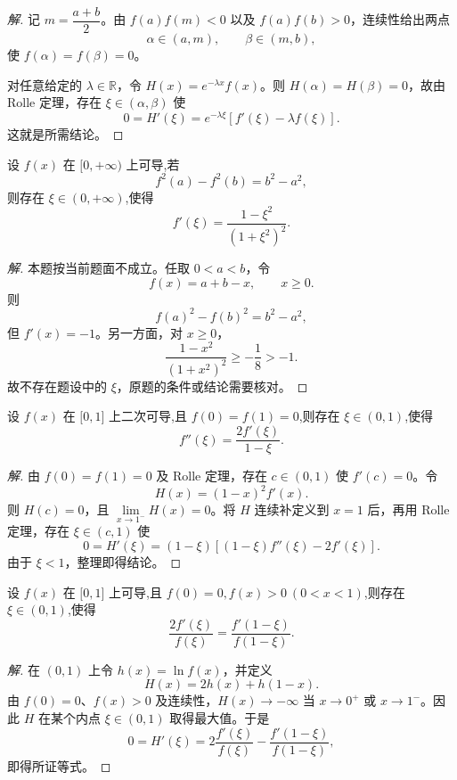 \documentclass[../../数学分析培优讲义(答案版).tex]{subfiles}
\begin{document}
\begin{proof}[解]
记 $m=\dfrac{a+b}{2}$。由 $f(a)f(m)<0$ 以及 $f(a)f(b)>0$，连续性给出两点
\[
    \alpha\in(a,m),
    \qquad
    \beta\in(m,b),
\]
使 $f(\alpha)=f(\beta)=0$。

对任意给定的 $\lambda\in\mathbb{R}$，令 $H(x)=e^{-\lambda x}f(x)$。则 $H(\alpha)=H(\beta)=0$，故由 Rolle 定理，存在 $\xi\in(\alpha,\beta)$ 使
\[
    0=H'(\xi)=e^{-\lambda\xi}[f'(\xi)-\lambda f(\xi)].
\]
这就是所需结论。
\end{proof}

\begin{example}
设 $f(x)$ 在 $\lbrack 0,+\infty)$ 上可导,若
\[
    f^2(a)-f^2(b)=b^2-a^2,
\]
则存在 $\xi\in(0,+\infty)$,使得
\[
    f'(\xi)=\dfrac{1-\xi^2}{(1+\xi^2)^2}.
\]
\end{example}

\begin{proof}[解]
本题按当前题面不成立。任取 $0<a<b$，令
\[
    f(x)=a+b-x,
    \qquad x\geq0.
\]
则
\[
    f(a)^2-f(b)^2=b^2-a^2,
\]
但 $f'(x)=-1$。另一方面，对 $x\geq0$，
\[
    \dfrac{1-x^2}{(1+x^2)^2}\geq-\dfrac{1}{8}>-1.
\]
故不存在题设中的 $\xi$，原题的条件或结论需要核对。
\end{proof}

\begin{example}
设 $f(x)$ 在 $\lbrack 0,1\rbrack$ 上二次可导,且 $f(0)=f(1)=0$,则存在 $\xi\in(0,1)$,使得
\[
    f''(\xi)=\dfrac{2f'(\xi)}{1-\xi}.
\]
\end{example}

\begin{proof}[解]
由 $f(0)=f(1)=0$ 及 Rolle 定理，存在 $c\in(0,1)$ 使 $f'(c)=0$。令
\[
    H(x)=(1-x)^2f'(x).
\]
则 $H(c)=0$，且 $\lim\limits_{x\to1^-}H(x)=0$。将 $H$ 连续补定义到 $x=1$ 后，再用 Rolle 定理，存在 $\xi\in(c,1)$ 使
\[
    0=H'(\xi)
    =(1-\xi)[(1-\xi)f''(\xi)-2f'(\xi)].
\]
由于 $\xi<1$，整理即得结论。
\end{proof}

\begin{example}
设 $f(x)$ 在 $\lbrack 0,1\rbrack$ 上可导,且 $f(0)=0,f(x)>0\ (0<x<1)$,则存在 $\xi\in(0,1)$,使得
\[
    \dfrac{2f'(\xi)}{f(\xi)}
    =\dfrac{f'(1-\xi)}{f(1-\xi)}.
\]
\end{example}

\begin{proof}[解]
在 $(0,1)$ 上令 $h(x)=\ln f(x)$，并定义
\[
    H(x)=2h(x)+h(1-x).
\]
由 $f(0)=0$、$f(x)>0$ 及连续性，$H(x)\to-\infty$ 当 $x\to0^+$ 或 $x\to1^-$。因此 $H$ 在某个内点 $\xi\in(0,1)$ 取得最大值。于是
\[
    0=H'(\xi)
    =2\dfrac{f'(\xi)}{f(\xi)}
    -\dfrac{f'(1-\xi)}{f(1-\xi)},
\]
即得所证等式。
\end{proof}
\end{document}
